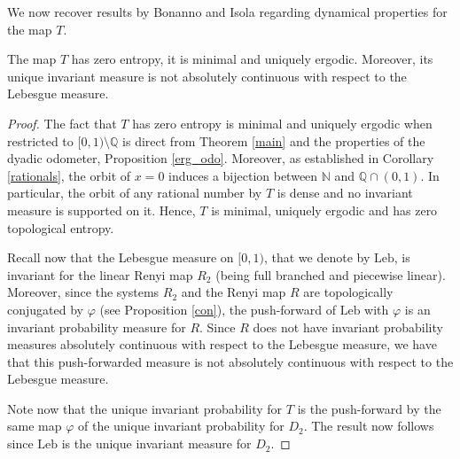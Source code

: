 \documentclass[letterpaper,10pt,reqno]{amsart}
\numberwithin{equation}{section}     %
\newcommand{\N}{\mathbb{N}}
\def\phi{\varphi}
\def\N{{\mathbb N}}
\def\Q{{\mathbb Q}}
\begin{document}
%


We now recover results by Bonanno and Isola \cite{bi} regarding dynamical properties for the map $T$.

\begin{corollary} \label{ergodic:T}
The map $T$ has zero entropy, it is minimal and uniquely ergodic. Moreover, its unique invariant measure is not absolutely continuous with respect to the Lebesgue measure.
\end{corollary} 

\begin{proof}
The fact that $T$ has zero entropy is minimal and uniquely ergodic when restricted to $[0,1)\setminus \Q$ is direct from Theorem \ref{main} and the properties of the dyadic odometer, Proposition \ref{erg_odo}. Moreover, as established in Corollary \ref{rationals}, the orbit of $x=0$ induces a bijection between $\N$ and $\Q \cap (0,1)$. In particular, the orbit of any rational number by $T$ is dense and no invariant measure is supported on it. Hence, $T$  is minimal, uniquely ergodic and has zero topological entropy.

Recall now that the Lebesgue measure on $[0,1)$, that we denote by $\text{Leb}$, is invariant for the linear Renyi map $R_2$ (being full branched and piecewise linear). Moreover, since the systems $R_2$ and the Renyi map $R$ are topologically conjugated by $\phi$ (see 
Proposition \ref{con}), the push-forward of $\text{Leb}$ with $\phi$ is an invariant probability measure for $R$. Since $R$ does not have  invariant probability measures absolutely continuous with respect to the Lebesgue measure, we have that this push-forwarded measure is not absolutely continuous with respect to the Lebesgue measure. 

Note now that the unique invariant probability for $T$ is the push-forward by the same map $\phi$ of the unique invariant probability for $D_2$. The result now follows since $\text{Leb}$ is the unique invariant measure for $D_2$.
\end{proof} 
 
\end{document}
